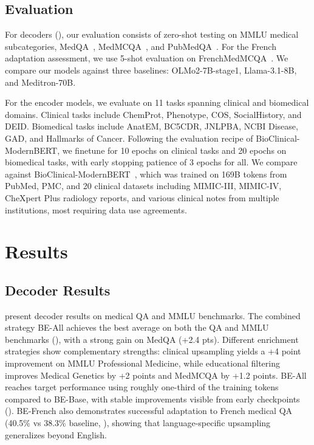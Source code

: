\subsection{Evaluation}

\begin{reviewread}
For decoders (), our evaluation consists of zero-shot testing on MMLU medical subcategories, MedQA~\citep{jin2021medqa}, MedMCQA~\citep{pal2022medmcqa}, and PubMedQA~\citep{jin2019pubmedqa}. For the French adaptation assessment, we use 5-shot evaluation on FrenchMedMCQA~\citep{labrak-etal-2022}. We compare our models against three baselines: OLMo2-7B-stage1, Llama-3.1-8B, and Meditron-70B.
\end{reviewread}

\begin{reviewread}
For the encoder models, we evaluate on 11 tasks spanning clinical and biomedical domains. Clinical tasks include ChemProt, Phenotype, COS, SocialHistory, and DEID. Biomedical tasks include AnatEM, BC5CDR, JNLPBA, NCBI Disease, GAD, and Hallmarks of Cancer. Following the evaluation recipe of BioClinical-ModernBERT, we finetune for 10 epochs on clinical tasks and 20 epochs on biomedical tasks, with early stopping patience of 3 epochs for all. We compare against BioClinical-ModernBERT~\citep{sounack2025bioclinicalmodernbert}, which was trained on 169B tokens from PubMed, PMC, and 20 clinical datasets including MIMIC-III, MIMIC-IV, CheXpert Plus radiology reports, and various clinical notes from multiple institutions, most requiring data use agreements.
\end{reviewread}


\section{Results}
\label{sec:results}

\subsection{Decoder Results}

\begin{reviewread}
 present decoder results on medical QA and MMLU benchmarks. The combined strategy BE-All achieves the best average on both the QA and MMLU benchmarks (), with a strong gain on MedQA (+2.4 pts). Different enrichment strategies show complementary strengths: clinical upsampling yields a +4 point improvement on MMLU Professional Medicine, while educational filtering improves Medical Genetics by +2 points and MedMCQA by +1.2 points. BE-All reaches target performance using roughly one-third of the training tokens compared to BE-Base, with stable improvements visible from early checkpoints (). BE-French also demonstrates successful adaptation to French medical QA (40.5\% vs 38.3\% baseline, ), showing that language-specific upsampling generalizes beyond English.
\end{reviewread}

